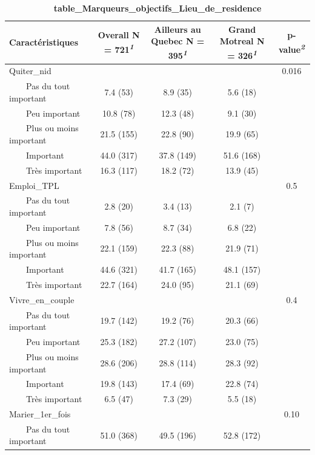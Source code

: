 \documentclass[
]{article}
\begin{document}
\begin{table}[!t]
\caption{\label{tab:unnamed-chunk-56}\textbf{table\_Marqueurs\_objectifs\_Lieu\_de\_residence}} 
\fontsize{12.0pt}{14.4pt}\selectfont
\begin{tabular*}{\linewidth}{@{\extracolsep{\fill}}lcccc}
\toprule
\textbf{Caractéristiques} & \textbf{Overall}  N = 721\textsuperscript{\textit{1}} & \textbf{Ailleurs au Quebec}  N = 395\textsuperscript{\textit{1}} & \textbf{Grand Motreal}  N = 326\textsuperscript{\textit{1}} & \textbf{p-value}\textsuperscript{\textit{2}} \\ 
\midrule\addlinespace[2.5pt]
Quiter\_nid &  &  &  & 0.016 \\ 
    Pas du tout important & 7.4 (53) & 8.9 (35) & 5.6 (18) &  \\ 
    Peu important & 10.8 (78) & 12.3 (48) & 9.1 (30) &  \\ 
    Plus ou moins important & 21.5 (155) & 22.8 (90) & 19.9 (65) &  \\ 
    Important & 44.0 (317) & 37.8 (149) & 51.6 (168) &  \\ 
    Très important & 16.3 (117) & 18.2 (72) & 13.9 (45) &  \\ 
Emploi\_TPL &  &  &  & 0.5 \\ 
    Pas du tout important & 2.8 (20) & 3.4 (13) & 2.1 (7) &  \\ 
    Peu important & 7.8 (56) & 8.7 (34) & 6.8 (22) &  \\ 
    Plus ou moins important & 22.1 (159) & 22.3 (88) & 21.9 (71) &  \\ 
    Important & 44.6 (321) & 41.7 (165) & 48.1 (157) &  \\ 
    Très important & 22.7 (164) & 24.0 (95) & 21.1 (69) &  \\ 
Vivre\_en\_couple &  &  &  & 0.4 \\ 
    Pas du tout important & 19.7 (142) & 19.2 (76) & 20.3 (66) &  \\ 
    Peu important & 25.3 (182) & 27.2 (107) & 23.0 (75) &  \\ 
    Plus ou moins important & 28.6 (206) & 28.8 (114) & 28.3 (92) &  \\ 
    Important & 19.8 (143) & 17.4 (69) & 22.8 (74) &  \\ 
    Très important & 6.5 (47) & 7.3 (29) & 5.5 (18) &  \\ 
Marier\_1er\_fois &  &  &  & 0.10 \\ 
    Pas du tout important & 51.0 (368) & 49.5 (196) & 52.8 (172) &  \\ 

\end{tabular*}
\end{table}
\end{document}
